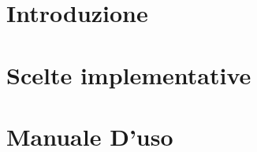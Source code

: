 \documentclass{article}
\begin{document}
  \section{Introduzione}
  \section{Scelte implementative}
  
  \section{Manuale D'uso}
\end{document}
